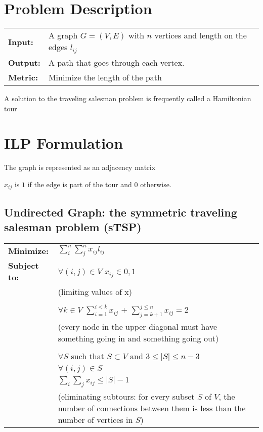 \documentclass{article}
\begin{document}
\section{Problem Description}
\begin{tabular}{l p{10cm}}
  \textbf{Input:} & A graph $G = (V, E)$ with $n$ vertices and length on the
  edges $l_{ij}$ \\
  \textbf{Output:} & A path that goes through each vertex.\\
  \textbf{Metric:} & Minimize the length of the path\\
\end{tabular}

A solution to the traveling salesman problem is frequently called a Hamiltonian
tour

\section{ILP Formulation}
The graph is represented as an adjacency matrix

$x_{ij}$ is $1$ if the edge is part of the tour and $0$ otherwise.

\subsection{Undirected Graph: the symmetric traveling salesman problem (sTSP)}
\begin{tabular}{l p{10cm}}
  \textbf{Minimize:} & $\sum_{i}^{n} \sum_{j}^{n} x_{ij} l_{ij}$ \\
  \textbf{Subject to:} & $\forall{(i, j) \in V}$ $x_{ij} \in {0, 1}$ \\
  & (limiting values of x) \\
  & \\
  & $\forall{k \in V}$ $\sum_{i=1}^{i<k} x_{ij}$ + $\sum_{j=k+1}^{j \leq n}
  x_{ij} = 2$ \\
  & (every node in the upper diagonal must have something going in and
  something going out) \\
  & \\
  & $\forall {S}$ such that $ S \subset V$ and $3 \leq |S| \leq n - 3$ \\
  & $\forall{(i, j) \in S}$ \\
  & $\sum_{i} \sum_{j} x_{ij} \leq |S| - 1$ \\
  & (eliminating subtours: for every subset $S$ of $V$, the number of
  connections between them is less than the number of vertices in $S$) \\
\end{tabular}
\end{document}
